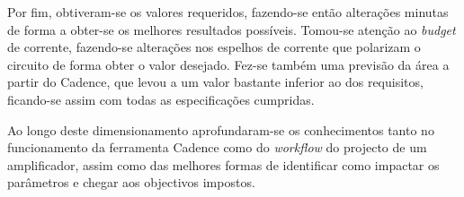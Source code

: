 \documentclass[11pt]{article}
\numberwithin{equation}{section}
\begin{document}
Por fim, obtiveram-se os valores requeridos, fazendo-se então alterações minutas de forma a obter-se os melhores resultados possíveis. Tomou-se atenção ao \textit{budget} de corrente, fazendo-se alterações nos espelhos de corrente que polarizam o circuito de forma obter o valor desejado. Fez-se também uma previsão da área a partir do Cadence, que levou a um valor bastante inferior ao dos requisitos, ficando-se assim com todas as especificações cumpridas.

Ao longo deste dimensionamento aprofundaram-se os conhecimentos tanto no funcionamento da ferramenta Cadence como do \textit{workflow} do projecto de um amplificador, assim como das melhores formas de identificar como impactar os parâmetros e chegar aos objectivos impostos.

\pagebreak

\listoftodos[Notes]
\end{document}
